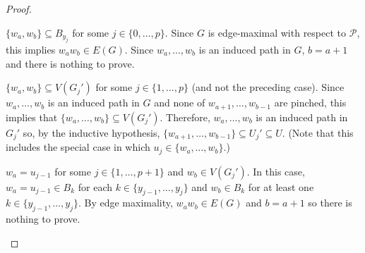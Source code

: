 \documentclass[kpfonts]{patmorin}
\theoremstyle{named}
\begin{document}
\begin{proof}
    \begin{compactenum}
       \item $\{w_a,w_b\}\subseteq B_{y_j}$ for some $j\in\{0,\ldots,p\}$.  Since $G$ is edge-maximal with respect to $\mathcal{P}$, this implies  $w_aw_b\in E(G)$. Since $w_a,\ldots,w_b$ is an induced path in $G$, $b=a+1$ and there is nothing to prove.

       \item $\{w_a,w_b\}\subseteq V(G_j')$ for some $j\in\{1,\ldots,p\}$ (and not the preceding case).
       Since $w_a,\ldots,w_b$ is an induced path in $G$ and none of $w_{a+1},\ldots,w_{b-1}$ are pinched, this implies that $\{w_a,\ldots,w_b\}\subseteq V(G_j')$.  Therefore, $w_a,\ldots,w_b$ is an induced path in $G_j'$ so, by the inductive hypothesis, $\{w_{a+1},\ldots,w_{b-1}\}\subseteq U_j'\subseteq U$.  (Note that this includes the special case in which $u_j\in\{w_a,\ldots,w_b\}$.)

       \item $w_a = u_{j-1}$ for some $j\in\{1,\ldots,p+1\}$ and $w_b\in V(G_{j}')$.  In this case, $w_a=u_{j-1}\in B_{k}$ for each $k\in\{y_{j-1},\ldots,y_{j}\}$ and $w_b\in B_{k}$ for at least one $k\in\{y_{j-1},\ldots,y_{j}\}$.  By edge maximality, $w_aw_b\in E(G)$ and $b=a+1$ so there is nothing to prove.  \qedhere
    \end{compactenum}
\end{proof}
\end{document}
